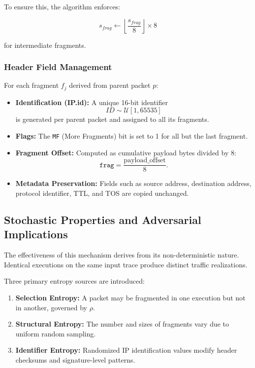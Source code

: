 To ensure this, the algorithm enforces:

\[
s_{frag} \leftarrow \left\lfloor \frac{s_{frag}}{8} \right\rfloor \times 8
\]

for intermediate fragments.

\subsubsection{Header Field Management}

For each fragment $f_j$ derived from parent packet $p$:

\begin{itemize}
    \item \textbf{Identification (IP.id):}  
    A unique 16-bit identifier
    \[
    ID \sim \mathcal{U}[1, 65535]
    \]
    is generated per parent packet and assigned to all its fragments.

    \item \textbf{Flags:}  
    The \texttt{MF} (More Fragments) bit is set to 1 for all but the last fragment.

    \item \textbf{Fragment Offset:}  
    Computed as cumulative payload bytes divided by 8:
    \[
    \texttt{frag} = \frac{\text{payload\_offset}}{8}.
    \]

    \item \textbf{Metadata Preservation:}  
    Fields such as source address, destination address, protocol identifier, TTL, and TOS are copied unchanged.
\end{itemize}


\subsection{Stochastic Properties and Adversarial Implications}

The effectiveness of this mechanism derives from its non-deterministic nature. Identical executions on the same input trace produce distinct traffic realizations.

Three primary entropy sources are introduced:

\begin{enumerate}
    \item \textbf{Selection Entropy:}  
    A packet may be fragmented in one execution but not in another, governed by $\rho$.

    \item \textbf{Structural Entropy:}  
    The number and sizes of fragments vary due to uniform random sampling.

    \item \textbf{Identifier Entropy:}  
    Randomized IP identification values modify header checksums and signature-level patterns.
\end{enumerate}

